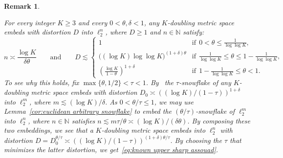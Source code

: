 \documentclass[11pt,reqno]{amsart}
\newtheorem{remark}[theorem]{Remark}
\newcommand{\N}{\mathbb{N}}
\renewcommand{\le}{\leqslant}
\renewcommand{\ge}{\geqslant}
\renewcommand{\d}{\delta}
\newcommand{\1}{\mathbf{1}}
\begin{document}
\begin{remark}\label{rem:known sharp assouad} {\em For every integer  $K\ge 3$ and every  $0<\theta,\d< 1$, any $K$-doubling metric space embeds with distortion $D$ into $\ell_2^n$, where $D\ge 1$ and $n\in \N$ satisfy:  
\begin{equation}\label{eq:known upper sharp assouad}
n\asymp \frac{\log K}{\d\theta}\qquad\mathrm{and}\qquad  D\lesssim \left\{ \begin{array}{ll} 1 &\mathrm{if\ }\ 0<\theta\le \frac{1}{\log\log K},\\ \big((\log K)\log\log K\big)^{(1+\d)\theta} &\mathrm{if\ }\  \frac{1}{\log\log K}\le \theta\le 1-\frac{1}{\log \log K},\\
\left(\frac{\log K}{1-\theta}\right)^{1+\d}&\mathrm{if\ }\  1-\frac{1}{\log \log K}\le \theta<1.\end{array}\right.
\end{equation}
To see why this holds, fix  $\max\{\theta,1/2\}<\tau<1$. By~\cite{NN} the $\tau$-snowflake of any $K$-doubling metric space  embeds with distortion  $D_0 \asymp ((\log K)/(1-\tau))^{1+\d}$ into $\ell_2^m$, where  $m\lesssim (\log K)/\d$.  As $0<\theta/\tau\le 1$, we may use  Lemma~\ref{cor:euclidean arbitrary snowflake} to embed the $(\theta/\tau)$-snowflake of $\ell_2^m$ into $\ell_2^n$, where $n\in \N$ satisfies $n\lesssim m\tau/\theta\asymp (\log K)/(\d\theta)$.  By composing these two embeddings, we see that a $K$-doubling metric space  embeds into $\ell_2^n$ with distortion  $D=D_0^{\theta/\tau}\asymp ((\log K)/(1-\tau))^{(1+\d)\theta/\tau}$. By choosing the $\tau$ that minimizes the latter distortion, we get~\eqref{eq:known upper sharp assouad}.

}
\end{remark}
\end{document}

